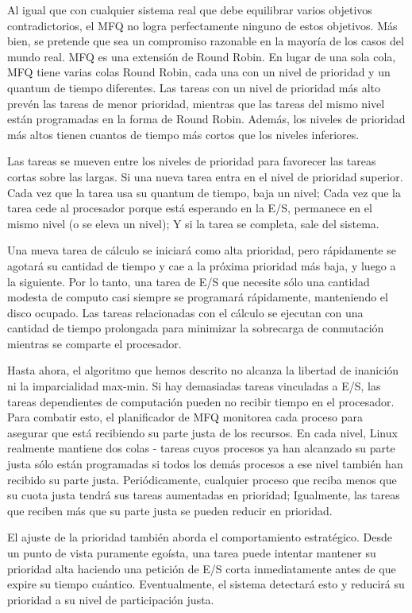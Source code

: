 \documentclass[10pt]{book}
\begin{document}
Al igual que con cualquier sistema real que debe equilibrar varios objetivos contradictorios, el MFQ no logra perfectamente ninguno de estos objetivos. Más bien, se pretende que sea un compromiso razonable en la mayoría de los casos del mundo real. MFQ es una extensión de Round Robin. En lugar de una sola cola, MFQ tiene varias colas Round Robin, cada una con un nivel de prioridad y un quantum de tiempo diferentes. Las tareas con un nivel de prioridad más alto prevén las tareas de menor prioridad, mientras que las tareas del mismo nivel están programadas en la forma de Round Robin. Además, los niveles de prioridad más altos tienen cuantos de tiempo más cortos que los niveles inferiores.

Las tareas se mueven entre los niveles de prioridad para favorecer las tareas cortas sobre las largas. Si una nueva tarea entra en el nivel de prioridad superior. Cada vez que la tarea usa su quantum de tiempo, baja un nivel; Cada vez que la tarea cede al procesador porque está esperando en la E/S, permanece en el mismo nivel (o se eleva un nivel); Y si la tarea se completa, sale del sistema.

Una nueva tarea de cálculo se iniciará como alta prioridad, pero rápidamente se agotará su cantidad de tiempo y cae a la próxima prioridad más baja, y luego a la siguiente. Por lo tanto, una tarea de E/S que necesite sólo una cantidad modesta de computo casi siempre se programará rápidamente, manteniendo el disco ocupado. Las tareas relacionadas con el cálculo se ejecutan con una cantidad de tiempo prolongada para minimizar la sobrecarga de conmutación mientras se comparte el procesador.

Hasta ahora, el algoritmo que hemos descrito no alcanza la libertad de inanición ni la imparcialidad max-min. Si hay demasiadas tareas vinculadas a E/S, las tareas dependientes de computación pueden no recibir tiempo en el procesador. Para combatir esto, el planificador de MFQ monitorea cada proceso para asegurar que está recibiendo su parte justa de los recursos. En cada nivel, Linux realmente mantiene dos colas - tareas cuyos procesos ya han alcanzado su parte justa sólo están programadas si todos los demás procesos a ese nivel también han recibido su parte justa. Periódicamente, cualquier proceso que reciba menos que su cuota justa tendrá sus tareas aumentadas en prioridad; Igualmente, las tareas que reciben más que su parte justa se pueden reducir en prioridad.

El ajuste de la prioridad también aborda el comportamiento estratégico. Desde un punto de vista puramente egoísta, una tarea puede intentar mantener su prioridad alta haciendo una petición de E/S corta inmediatamente antes de que expire su tiempo cuántico. Eventualmente, el sistema detectará esto y reducirá su prioridad a su nivel de participación justa.
\end{document}

